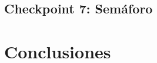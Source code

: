 \documentclass{article}
\begin{document}
\subsection{Checkpoint 7: Semáforo}

\section{Conclusiones}



\end{document}
